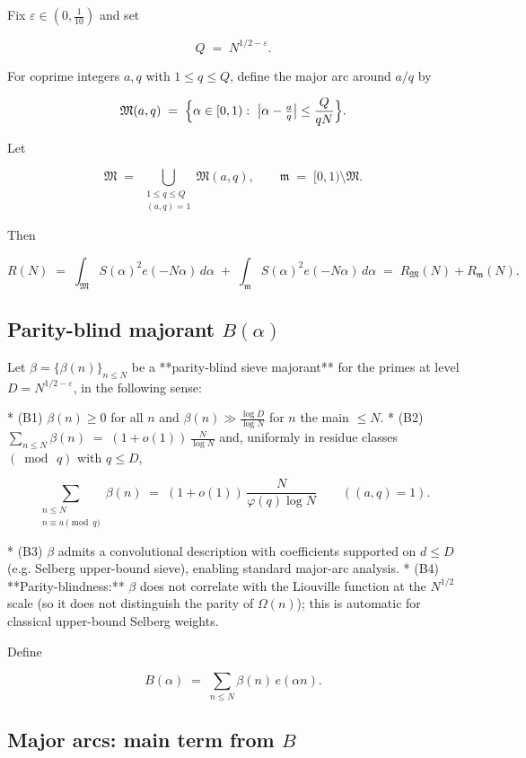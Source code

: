 \documentclass[11pt]{article}
\theoremstyle{definition}
\theoremstyle{remark}
\begin{document}
Fix $\varepsilon\in (0,\tfrac1{10})$ and set

$$
Q \;=\; N^{1/2-\varepsilon}.
$$

For coprime integers $a,q$ with $1\le q\le Q$, define the major arc around $a/q$ by

$$
\mathfrak M(a,q)\;=\;\Bigl\{\alpha\in[0,1):\ \bigl|\alpha-\tfrac{a}{q}\bigr|
\le \frac{Q}{qN}\Bigr\}.
$$

Let

$$
\mathfrak M\;=\;\bigcup_{\substack{1\le q\le Q\\ (a,q)=1}}\mathfrak M(a,q),
\qquad
\mathfrak m\;=\;[0,1)\setminus\mathfrak M .
$$

Then

$$
R(N)\;=\;\int_{\mathfrak M} S(\alpha)^2 e(-N\alpha)\,d\alpha\;+\;
\int_{\mathfrak m} S(\alpha)^2 e(-N\alpha)\,d\alpha
\;=\;R_{\mathfrak M}(N)+R_{\mathfrak m}(N).
$$


\subsection*{Parity-blind majorant $B(\alpha)$}

Let $\beta=\{\beta(n)\}_{n\le N}$ be a **parity-blind sieve majorant** for the primes at level $D=N^{1/2-\varepsilon}$, in the following sense:

* (B1) $\beta(n)\ge 0$ for all $n$ and $\beta(n)\gg \tfrac{\log D}{\log N}$ for $n$ the main $\le N$.
* (B2) $\displaystyle \sum_{n\le N}\beta(n)\;=\;(1+o(1))\,\frac{N}{\log N}$ and, uniformly in residue classes $(\bmod\,q)$ with $q\le D$,

$$
\sum_{\substack{n\le N\\ n\equiv a\!\!\!\pmod q}}\beta(n)
\;=\;(1+o(1))\,\frac{N}{\varphi(q)\log N}\qquad ((a,q)=1).
$$

* (B3) $\beta$ admits a convolutional description with coefficients supported on $d\le D$ (e.g. Selberg upper-bound sieve), enabling standard major-arc analysis.
* (B4) **Parity-blindness:** $\beta$ does not correlate with the Liouville function at the $N^{1/2}$ scale (so it does not distinguish the parity of $\Omega(n)$); this is automatic for classical upper-bound Selberg weights.

Define

$$
B(\alpha)\;=\;\sum_{n\le N}\beta(n)\,e(\alpha n).
$$


\subsection*{Major arcs: main term from $B$}
\end{document}
